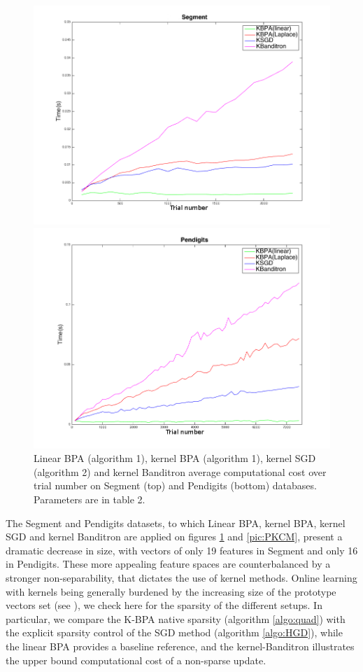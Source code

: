 \documentclass[preprint,12pt,authoryear]{elsarticle}
\begin{document}
\begin{figure}[htp]

	\centerline{
		\includegraphics[width=.7\linewidth]{figs/Segment_kernel_T.png}}
	\centerline{\includegraphics[width=.7\linewidth]{figs/Pendigits_kernel_T.png}}
\caption{Linear BPA (algorithm 1), kernel BPA (algorithm 1), kernel SGD (algorithm 2)  and kernel Banditron average computational cost over trial number on Segment (top) and Pendigits (bottom) databases. Parameters are in table 2.}
\label{pic:PKT}	
\end{figure}

The Segment and Pendigits datasets, to which Linear BPA, kernel BPA, kernel SGD and kernel Banditron are applied on figures \ref{pic:PKT} and \ref{pic:PKCM}, present a dramatic decrease in size, with vectors of only 19 features in Segment and only 16 in Pendigits.
These more appealing feature spaces are counterbalanced by a stronger non-separability, that dictates the use of kernel methods. 
Online learning with kernels being generally burdened by the increasing size of the prototype vectors set (see \cite{kivinen2004online}), we check here for the sparsity of the different setups. In particular, we compare the K-BPA native sparsity (algorithm \ref{algo:quad}) with the explicit sparsity control of the SGD method (algorithm \ref{algo:HGD}), while the linear BPA provides a baseline reference, and the kernel-Banditron illustrates the upper bound computational cost of a non-sparse update. 
\end{document}

